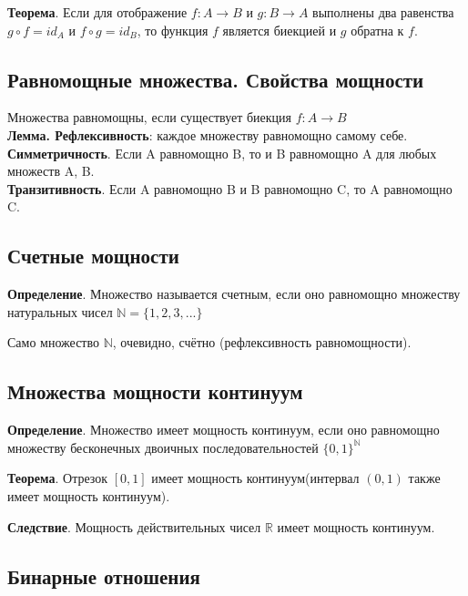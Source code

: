 \documentclass[a4paper, 10pt]{article}
\begin{document}
\textbf{Теорема}. Если для отображение $f: A \to B$ и $g\colon B \to A$ выполнены два равенства $g \circ f = id_A$ и $f \circ g = id_B$, то функция $f$ является биекцией и $g$ обратна к $f$.



\subsection{Равномощные множества. Свойства мощности}

Множества равномощны, если существует биекция $f\colon A \to B$ \\

\textbf{Лемма. Рефлексивность}: каждое множеству равномощно самому себе. \\

\textbf{Симметричность}. Если A равномощно B, то и B равномощно A для любых множеств A, B. \\

\textbf{Транзитивность}. Если A равномощно B и B равномощно C, то A равномощно C.


\subsection{Счетные мощности}

\textbf{Определение}. Множество называется счетным, если оно равномощно множеству натуральных чисел $\mathbb{N} = \{1, 2, 3, ...\}$

Само множество $\mathbb{N}$, очевидно, счётно (рефлексивность равномощности).


\subsection{Множества мощности континуум}



\textbf{Определение}. Множество имеет мощность континуум, если оно равномощно множеству бесконечных двоичных последовательностей $\{0, 1\}^{\mathbb{N}}$

\textbf{Теорема}. Отрезок $[0, 1]$ имеет мощность континуум(интервал $(0, 1)$ также имеет мощность континуум).

\textbf{Следствие}. Мощность действительных чисел $\mathbb{R}$ имеет мощность континуум.


\subsection{Бинарные отношения}
\end{document}
